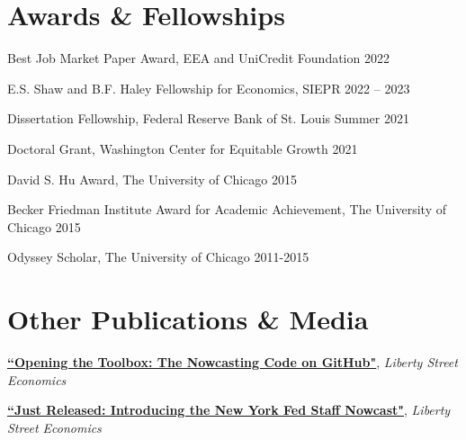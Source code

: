 \documentclass[margin,line]{res}                          %
\newenvironment{list1}{
	\begin{list}{\ding{113}}{%
			\setlength{\itemsep}{0in}
			\setlength{\parsep}{0in} \setlength{\parskip}{0in}
			\setlength{\topsep}{0in} \setlength{\partopsep}{0in}
			\setlength{\leftmargin}{0.17in}}}{\end{list}}
\begin{document}
\begin{resume}
	\section{\sc Awards \& Fellowships}
	\begin{list1}
		\item[] Best Job Market Paper Award, EEA and UniCredit Foundation
		\hfill 2022\smallskip
		\item[] E.S. Shaw and B.F. Haley Fellowship for Economics, SIEPR \hfill 2022 -- 2023\smallskip
		\item[] Dissertation Fellowship, Federal Reserve Bank of St. Louis  \hfill Summer 2021\smallskip
		\item[] Doctoral Grant, Washington Center for Equitable Growth \hfill 2021\smallskip
		\item[] David S. Hu Award, The University of Chicago \hfill 2015\smallskip
		\item[] Becker Friedman Institute Award for Academic Achievement, The University of Chicago \hfill 2015\smallskip
		\item[] Odyssey Scholar, The University of Chicago \hfill 2011-2015\smallskip
	\end{list1}
	
	\section{\sc Other Publications \& Media} 
	\begin{list1}
		\item[] \href{https://libertystreeteconomics.newyorkfed.org/2018/08/opening-the-toolbox-the-nowcasting-code-on-github/}{\textbf{``Opening the Toolbox: The Nowcasting Code on GitHub"}}, \textit{{Liberty Street Economics}}  \smallskip
		\item[] \href{https://libertystreeteconomics.newyorkfed.org/2016/04/just-released-introducing-the-frbny-nowcast/}{\textbf{``Just Released: Introducing the New York Fed Staff Nowcast"}}, \textit{{Liberty Street Economics}} \smallskip            
	\end{list1}
	
	
	
	
	
\end{resume}
\end{document}
